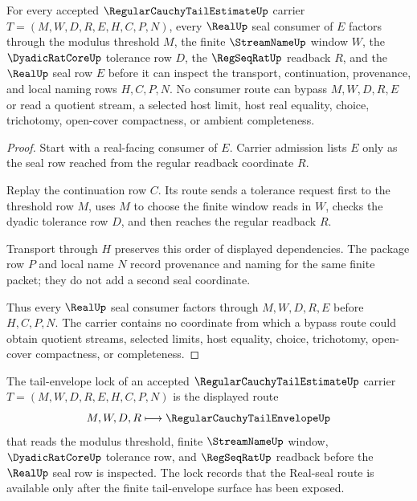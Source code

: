 \begin{theorem}
\label{thm:regular-cauchy-tail-estimate-real-seal-route}
For every accepted $\RegularCauchyTailEstimateUp$ carrier
$T=(M,W,D,R,E,H,C,P,N)$, every $\RealUp$ seal consumer of $E$ factors through
the modulus threshold $M$, the finite $\StreamNameUp$ window $W$, the
$\DyadicRatCoreUp$ tolerance row $D$, the $\RegSeqRatUp$ readback $R$, and the
$\RealUp$ seal row $E$ before it can inspect the transport, continuation,
provenance, and local naming rows $H,C,P,N$. No consumer route can bypass
$M,W,D,R,E$ or read a quotient stream, a selected host limit, host real
equality, choice, trichotomy, open-cover compactness, or ambient completeness.
\end{theorem}
\begin{proof}
Start with a real-facing consumer of $E$. Carrier admission lists $E$ only as
the seal row reached from the regular readback coordinate $R$.

Replay the continuation row $C$. Its route sends a tolerance request first to
the threshold row $M$, uses $M$ to choose the finite window reads in $W$, checks
the dyadic tolerance row $D$, and then reaches the regular readback $R$.

Transport through $H$ preserves this order of displayed dependencies. The
package row $P$ and local name $N$ record provenance and naming for the same
finite packet; they do not add a second seal coordinate.

Thus every $\RealUp$ seal consumer factors through $M,W,D,R,E$ before
$H,C,P,N$. The carrier contains no coordinate from which a bypass route could
obtain quotient streams, selected limits, host equality, choice, trichotomy,
open-cover compactness, or completeness.
\end{proof}

\begin{definition}
\label{def:regular-cauchy-tail-estimate-tail-envelope-lock}
The tail-envelope lock of an accepted $\RegularCauchyTailEstimateUp$ carrier
$T=(M,W,D,R,E,H,C,P,N)$ is the displayed route
$$
M,W,D,R \longmapsto \RegularCauchyTailEnvelopeUp
$$
that reads the modulus threshold, finite $\StreamNameUp$ window,
$\DyadicRatCoreUp$ tolerance row, and $\RegSeqRatUp$ readback before the
$\RealUp$ seal row is inspected. The lock records that the Real-seal route is
available only after the finite tail-envelope surface has been exposed.
\end{definition}

